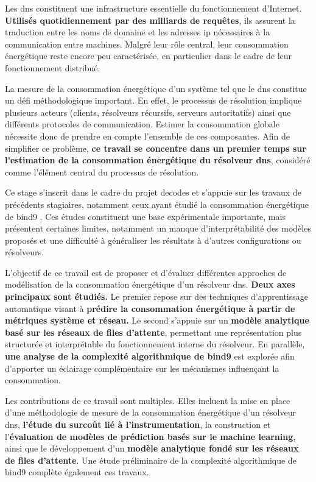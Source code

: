 \documentclass[12pt, a4paper]{report}
\begin{document}
	Les \gls{dns} constituent une infrastructure essentielle du fonctionnement d'Internet. \textbf{Utilisés quotidiennement par des milliards de requêtes}, ils assurent la traduction entre les noms de domaine et les adresses \gls{ip} nécessaires à la communication entre machines. Malgré leur rôle central, leur consommation énergétique reste encore peu caractérisée, en particulier dans le cadre de leur fonctionnement distribué.

	La mesure de la consommation énergétique d'un système tel que le \gls{dns} constitue un défi méthodologique important. En effet, le processus de résolution implique plusieurs acteurs (clients, résolveurs récursifs, serveurs autoritatifs) ainsi que différents protocoles de communication. Estimer la consommation globale nécessite donc de prendre en compte l'ensemble de ces composantes. Afin de simplifier ce problème, \textbf{ce travail se concentre dans un premier temps sur l'estimation de la consommation énergétique du résolveur \gls{dns}}, considéré comme l'élément central du processus de résolution.

	Ce stage s'inscrit dans le cadre du projet \gls{decodes} et s'appuie sur les travaux de précédents stagiaires, notamment ceux ayant étudié la consommation énergétique de \gls{bind9} \cite{renout2026dns_analysis}. Ces études constituent une base expérimentale importante, mais présentent certaines limites, notamment un manque d'interprétabilité des modèles proposés et une difficulté à généraliser les résultats à d'autres configurations ou résolveurs.

	L'objectif de ce travail est de proposer et d'évaluer différentes approches de modélisation de la consommation énergétique d'un résolveur \gls{dns}. \textbf{Deux axes principaux sont étudiés.} Le premier repose sur des techniques d'apprentissage automatique visant à \textbf{prédire la consommation énergétique à partir de métriques système et réseau.} Le second s'appuie sur un \textbf{modèle analytique basé sur les réseaux de files d'attente}, permettant une représentation plus structurée et interprétable du fonctionnement interne du résolveur. En parallèle, \textbf{une analyse de la complexité algorithmique de \gls{bind9}} est explorée afin d'apporter un éclairage complémentaire sur les mécanismes influençant la consommation.

	Les contributions de ce travail sont multiples. Elles incluent la mise en place d'une méthodologie de mesure de la consommation énergétique d'un résolveur \gls{dns}, \textbf{l'étude du surcoût lié à l'instrumentation}, la construction et l'\textbf{évaluation de modèles de prédiction basés sur le machine learning}, ainsi que le développement d'un \textbf{modèle analytique fondé sur les réseaux de files d'attente}. Une étude préliminaire de la complexité algorithmique de \gls{bind9} complète également ces travaux.
\end{document}

